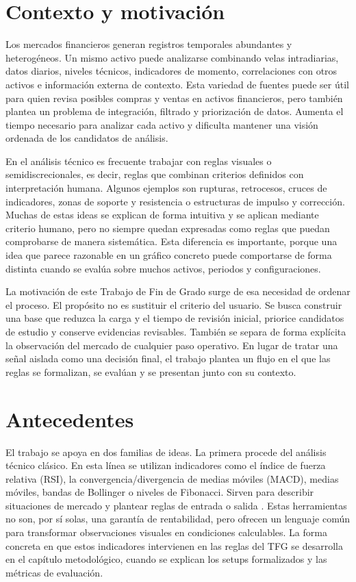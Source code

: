 \section{Contexto y motivaci\'on}

Los mercados financieros generan registros temporales abundantes y heterog\'eneos.
Un mismo activo puede analizarse combinando velas intradiarias,
datos diarios, niveles t\'ecnicos, indicadores de momento, correlaciones con
otros activos e informaci\'on externa de contexto. Esta variedad de fuentes puede
ser \'util para quien revisa posibles compras y ventas en activos financieros,
pero tambi\'en plantea un problema de integraci\'on, filtrado y priorizaci\'on de
datos. Aumenta el tiempo necesario para analizar cada activo y dificulta
mantener una visi\'on ordenada de los candidatos de an\'alisis.

En el an\'alisis t\'ecnico es frecuente trabajar con reglas visuales o
semidiscrecionales, es decir, reglas que combinan criterios definidos con
interpretaci\'on humana. Algunos ejemplos son rupturas, retrocesos, cruces de
indicadores, zonas de soporte y resistencia o estructuras de impulso y
correcci\'on. Muchas de estas
ideas se explican de forma intuitiva y se aplican mediante criterio humano,
pero no siempre quedan expresadas como reglas que puedan comprobarse de manera
sistem\'atica. Esta diferencia es importante, porque una idea que parece
razonable en un gr\'afico concreto puede comportarse de forma distinta cuando se
eval\'ua sobre muchos activos, periodos y configuraciones.

La motivaci\'on de este Trabajo de Fin de Grado surge de esa necesidad de ordenar el
proceso. El prop\'osito no es sustituir el criterio del usuario. Se busca construir
una base que reduzca la carga y el tiempo de revisi\'on inicial, priorice
candidatos de estudio y conserve evidencias revisables. Tambi\'en se separa de forma expl\'icita
la observaci\'on del mercado de cualquier paso operativo. En lugar de tratar una
se\~nal aislada como una decisi\'on final, el trabajo plantea un flujo en el que
las reglas se formalizan, se eval\'uan y se presentan junto con su contexto.

\section{Antecedentes}

El trabajo se apoya en dos familias de ideas. La primera procede del an\'alisis
t\'ecnico cl\'asico. En esta l\'inea se utilizan indicadores como el \'indice de fuerza relativa
(RSI), la convergencia/divergencia de medias m\'oviles (MACD), medias m\'oviles,
bandas de Bollinger o niveles de Fibonacci. Sirven para describir situaciones
de mercado y plantear reglas de entrada o salida \cite{murphy_1999_technical_analysis,wilder_1978_new_concepts,appel_2005_power_tools,bollinger_2001_bands}.
Estas herramientas no son, por s\'i solas, una garant\'ia de rentabilidad, pero
ofrecen un lenguaje com\'un para transformar observaciones visuales en
condiciones calculables. La forma concreta en que estos indicadores intervienen
en las reglas del TFG se desarrolla en el cap\'itulo metodol\'ogico, cuando se
explican los setups formalizados y las m\'etricas de evaluaci\'on.

